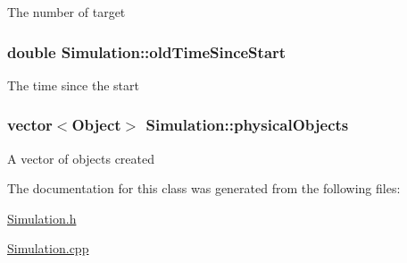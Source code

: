 The number of target \hypertarget{classSimulation_a9d5a2c76548907940c15b389344365df}{
\subsubsection[{old\-Time\-Since\-Start}]{\setlength{\rightskip}{0pt plus 5cm}double Simulation\-::old\-Time\-Since\-Start\hspace{0.3cm}{\ttfamily [private]}}}\label{classSimulation_a9d5a2c76548907940c15b389344365df}
The time since the start \hypertarget{classSimulation_ad85c769b3efdd6e70c797689d8f65e88}{
\subsubsection[{physical\-Objects}]{\setlength{\rightskip}{0pt plus 5cm}vector$<${\bf Object}$>$ Simulation\-::physical\-Objects\hspace{0.3cm}{\ttfamily [private]}}}\label{classSimulation_ad85c769b3efdd6e70c797689d8f65e88}
A vector of objects created 

The documentation for this class was generated from the following files\-:\begin{DoxyCompactItemize}
\item 
\hyperlink{Simulation_8h}{Simulation.\-h}\item 
\hyperlink{Simulation_8cpp}{Simulation.\-cpp}\end{DoxyCompactItemize}
